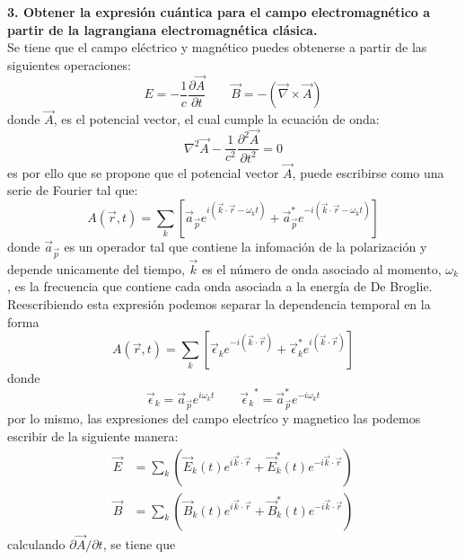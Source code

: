 \textbf{3. Obtener la expresión cuántica para el campo electromagnético a partir de la lagrangiana
electromagnética clásica.}\\
Se tiene que el campo eléctrico y magnético puedes obtenerse a partir de las siguientes operaciones:
\begin{equation*}
    E=-\frac{1}{c}\frac{\partial \vec{A}}{\partial t} \qquad \vec{B}= - \left(\vec{\nabla}\times\vec{A}\right)
\end{equation*}
donde $\vec{A}$, es el potencial vector, el cual cumple la ecuación de onda:
\begin{equation*}
    \nabla^2 \vec{A} - \frac{1}{c^2} \frac{\partial^2 \vec{A}}{\partial t^2}=0
\end{equation*}
es por ello que se propone que el potencial vector $\vec{A}$, puede escribirse como una serie de Fourier tal que:
\begin{equation*}
    A(\vec{r},t) =\sum_k\left[\vec{a}_{\vec{p}} e^{i\left(\vec{k}\cdot \vec{r}-\omega_k t \right)}+\vec{a}_{\vec{p}}^* e^{-i\left(\vec{k}\cdot \vec{r}-\omega_k t \right)}\right]
\end{equation*}
donde $\vec{a}_{\vec{p}}$ es un operador tal que contiene la infomación de la polarización y depende unicamente del tiempo, $\vec{k}$ es el número de onda asociado al momento, $\omega_k$, es la frecuencia 
que contiene cada onda asociada a la energía de De Broglie. Reescribiendo esta expresión podemos separar la dependencia temporal en la forma
\begin{equation*}
    A(\vec{r},t) =\sum_k \left[ \vec{\epsilon}_{k} e^{-i\left(\vec{k}\cdot \vec{r}\right)}+\vec{\epsilon}_{k}^* e^{i\left(\vec{k}\cdot \vec{r}\right)}\right]
\end{equation*}
donde 
\begin{equation*}
    \vec{\epsilon}_k= \vec{a}_{\vec{p}}  e^{i\omega_k t} \qquad {\vec{\epsilon}_k}^*= \vec{a}^*_{\vec{p}}  e^{-i\omega_k t}
\end{equation*}
por lo mismo, las expresiones del campo electríco y magnetico las podemos escribir de la siguiente manera:
\begin{align*}
    \vec{E}&=\sum_k \left(\vec{E}_k(t)e^{i\vec{k}\cdot \vec{r}}+\vec{E}_k^*(t)e^{-i\vec{k}\cdot \vec{r}}\right)\\
    \vec{B}&=\sum_k \left(\vec{B}_k(t)e^{i\vec{k}\cdot \vec{r}}+\vec{B}_k^*(t)e^{-i\vec{k}\cdot \vec{r}}\right)
\end{align*}
calculando $\partial \vec{A}/\partial t$, se tiene que
